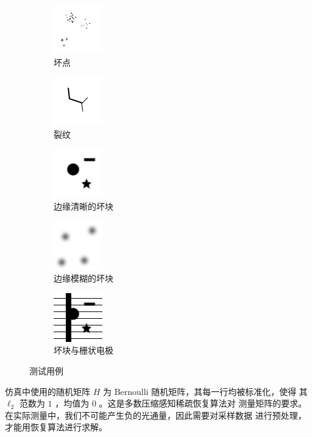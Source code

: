 \begin{figure}
\centering
\begin{subfigure}[t]{1.1in}
	\includegraphics{Figure/testdata/0d.png}
	\caption{坏点}
	\label{fig:testdata:0d}
\end{subfigure}
\begin{subfigure}[t]{1.1in}
	\includegraphics{Figure/testdata/1d.png}
	\caption{裂纹}
	\label{fig:testdata:1d}
\end{subfigure}
\begin{subfigure}[t]{1.1in}
	\includegraphics{Figure/testdata/2dsharp.png}
	\caption{边缘清晰的坏块}
\end{subfigure}
\begin{subfigure}[t]{1.1in}
	\includegraphics{Figure/testdata/2dsmooth.png}
	\caption{边缘模糊的坏块}
	\label{fig:testdata:2dsmooth}
\end{subfigure}
\begin{subfigure}[t]{1.1in}
	\includegraphics{Figure/testdata/2dsharp_finger.png}
	\caption{坏块与栅状电极}
\end{subfigure}
\caption{测试用例}
\label{fig:testdata}
\end{figure}

仿真中使用的随机矩阵 $H$ 为 Bernoulli 随机矩阵，其每一行均被标准化，使得
其 $\ell_2$ 范数为 $1$ ，均值为 $0$ 。这是多数压缩感知稀疏恢复算法对
测量矩阵的要求。 在实际测量中，我们不可能产生负的光通量，因此需要对采样数据
进行预处理，才能用恢复算法进行求解。

